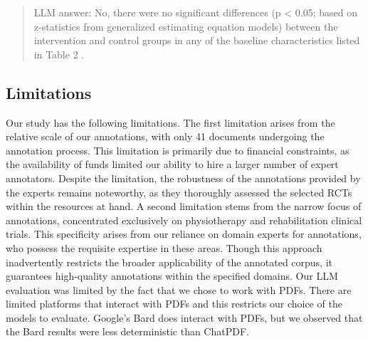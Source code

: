 \documentclass[sn-mathphys,Numbered]{sn-jnl}%
\theoremstyle{thmstyleone}%
\theoremstyle{thmstyletwo}%
\theoremstyle{thmstylethree}%
\begin{document}
\begin{quote}
    LLM answer: No, there were no significant differences (p < 0.05; based on z-statistics from generalized estimating equation models) between the intervention and control groups in any of the baseline characteristics listed in Table 2 .
\end{quote}







%
%
%
\subsection{Limitations}
\label{subsec:limits}
%
Our study has the following limitations.
The first limitation arises from the relative scale of our annotations, with only 41 documents undergoing the annotation process.
This limitation is primarily due to financial constraints, as the availability of funds limited our ability to hire a larger number of expert annotators.
Despite the limitation, the robustness of the annotations provided by the experts remains noteworthy, as they thoroughly assessed the selected RCTs within the resources at hand.
A second limitation stems from the narrow focus of annotations, concentrated exclusively on physiotherapy and rehabilitation clinical trials.
This specificity arises from our reliance on domain experts for annotations, who possess the requisite expertise in these areas.
Though this approach inadvertently restricts the broader applicability of the annotated corpus, it guarantees high-quality annotations within the specified domains.
Our LLM evaluation was limited by the fact that we chose to work with PDFs. 
There are limited platforms that interact with PDFs and this restricts our choice of the models to evaluate.
Google's Bard does interact with PDFs, but we observed that the Bard results were less deterministic than ChatPDF.
\end{document}
